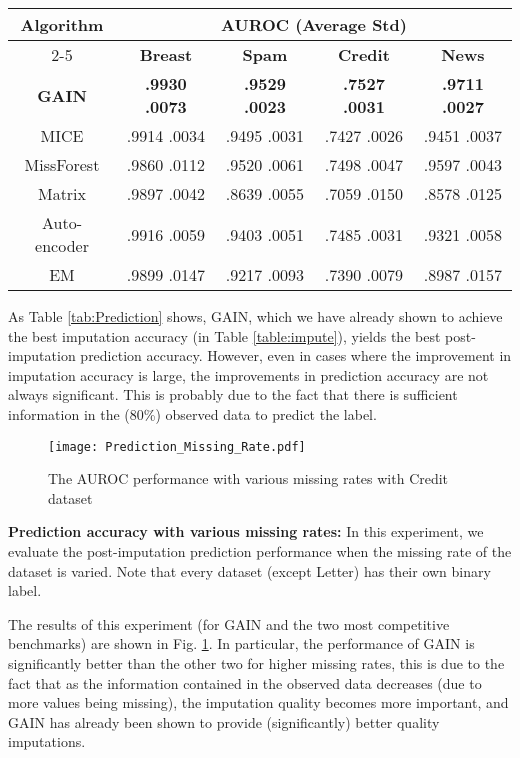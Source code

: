 \documentclass{article}
\begin{document}
\begin{table*}[t!]
	\renewcommand{\arraystretch}{1.3}
	\caption{Prediction performance comparison}
	\label{tab:Prediction}
	\centering
	\begin{tabular}{|c|c|c|c|c|}
		\toprule
		\multirow{2}{*}{\textbf{Algorithm}}&\multicolumn{4}{c|}{\textbf{AUROC (Average  Std)}}  \\
		\cmidrule{2-5}
		& \textbf{Breast} & \textbf{Spam} &  \textbf{Credit} & \textbf{News} \\
		\midrule
		\textbf{GAIN}& \textbf{.9930  .0073} & \textbf{.9529  .0023}  & \textbf{.7527  .0031} & \textbf{.9711  .0027}  \\
		\midrule
		MICE & .9914  .0034  & .9495  .0031 & .7427  .0026& .9451  .0037\\
		MissForest  & .9860  .0112&.9520  .0061&.7498  .0047& .9597  .0043 \\
		Matrix   & .9897  .0042 & .8639  .0055 & .7059  .0150 & .8578  .0125  \\
		Auto-encoder& .9916  .0059 & .9403  .0051 & .7485  .0031 & .9321  .0058 \\
		EM& .9899  .0147 & .9217  .0093 & .7390  .0079 & .8987  .0157 \\
		\bottomrule
	\end{tabular}
\end{table*}

As Table \ref{tab:Prediction} shows, GAIN, which we have already shown to achieve the best imputation accuracy (in Table \ref{table:impute}), yields the best post-imputation prediction accuracy. However, even in cases where the improvement in imputation accuracy is large, the  improvements in prediction accuracy are not always significant. This is probably due to the fact that there is sufficient information in the (80\%) observed data to predict the label.

\begin{figure}[t!]
	\center
	\texttt{[image: Prediction\_Missing\_Rate.pdf]}
	\caption{The AUROC performance with various missing rates with Credit dataset}
	\label{fig:prediction_missing_rate}
\end{figure}

\textbf{Prediction accuracy with various missing rates: }In this experiment, we evaluate the post-imputation prediction performance when the missing rate of the dataset is varied. Note that every dataset (except Letter) has their own binary label.

The results of this experiment (for GAIN and the two most competitive benchmarks) are shown in Fig. \ref{fig:prediction_missing_rate}. In particular, the performance of GAIN is significantly better than the other two for higher missing rates, this is due to the fact that as the information contained in the observed data decreases (due to more values being missing), the imputation quality becomes more important, and GAIN has already been shown to provide (significantly) better quality imputations.
\end{document}

